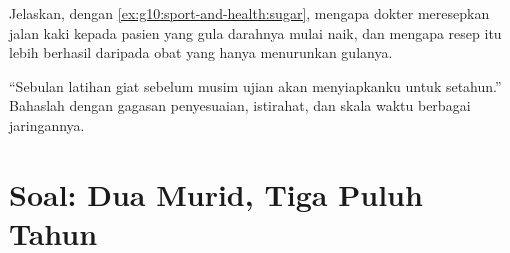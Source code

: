 \begin{exercise}[$\star\star\star$]\label{exo:g10:sport-and-health:14}
Jelaskan, dengan \cref{ex:g10:sport-and-health:sugar}, mengapa dokter
meresepkan jalan kaki kepada pasien yang gula darahnya mulai naik, dan
mengapa resep itu lebih berhasil daripada obat yang hanya menurunkan
gulanya.
\end{exercise}

\begin{exercise}[$\star\star\star$]\label{exo:g10:sport-and-health:15}
``Sebulan latihan giat sebelum musim ujian akan menyiapkanku untuk
setahun.'' Bahaslah dengan gagasan penyesuaian, istirahat, dan skala
waktu berbagai jaringannya.
\end{exercise}

\section{Soal: Dua Murid, Tiga Puluh Tahun}

